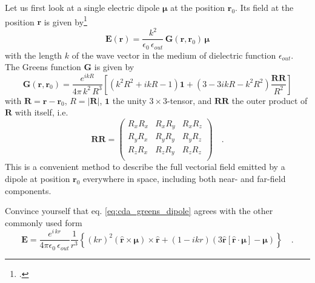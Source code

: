 Let us first look at a single electric dipole $\boldsymbol{\mu}$ at the position $\mathbf{r}_0$. Its field at the position $\mathbf{r}$ is given by\footcite[eq. 8.52]{Novotny-Hecht2012} 
\begin{equation}
\mathbf{E}(\mathbf{r}) = \frac{k^2}{\epsilon_0 \, \epsilon_{out}} \, \mathbf{G}(\mathbf{r}, \mathbf{r}_0) \,  \boldsymbol{\mu}
\end{equation}
with the length $k$ of the wave vector in the medium of dielectric function $\epsilon_{out}$.
The Greens function $\mathbf{G}$ is given by
\begin{equation}
\mathbf{G}(\mathbf{r}, \mathbf{r}_0) = \frac{e^{i k R} }{4 \pi \, k^2 \, R^3 } 
\left[  
 \left( k^2 R^2 + i k R  - 1 \right) \mathbf{1}  +    
  \left( 3 - 3 i k R - k^2 R^2  \right) \frac{\mathbf{RR}}{R^2}   
  \right] \label{eq:cda_greens_dipole}
\end{equation}
with $\mathbf{R} = \mathbf{r} - \mathbf{r}_0$, $R = |\mathbf{R}|$, $\mathbf{1}$ the unity $3 \times 3$-tensor, and $\mathbf{RR}$ the outer product of $\mathbf{R}$ with itself, i.e.
\begin{equation}
\mathbf{RR} = 
\begin{pmatrix}
R_x R_x &  R_x R_y & R_x R_z \\
R_y R_x &  R_y R_y & R_y R_z \\
R_z R_x &  R_z R_y & R_z R_z \\
\end{pmatrix} \quad .
\end{equation}
This is a convenient method to describe the full vectorial field emitted by a dipole at position  $\mathbf{r}_0$ everywhere in space, including both near- and far-field components.

\begin{questions}
\item Convince yourself that eq. \ref{eq:cda_greens_dipole} agrees with the other commonly used form 
\begin{equation}
  \mathbf{E} = \frac{ e^{i \, k  r} }{4\pi\epsilon_0 \, \epsilon_{out}}  \frac{1}{r^3}\left\{
      (k r )^2 \left( \hat{\mathbf{r}} \times \boldsymbol{\mu} \right) \times \hat{\mathbf{r}} +
      \left( 1 -  i k r \right)
        \left( 3\hat{\mathbf{r}} \left[\hat{\mathbf{r}} \cdot \boldsymbol{\mu}\right] - \boldsymbol{\mu} \right)
    \right\} \quad .
\end{equation}
\end{questions}

